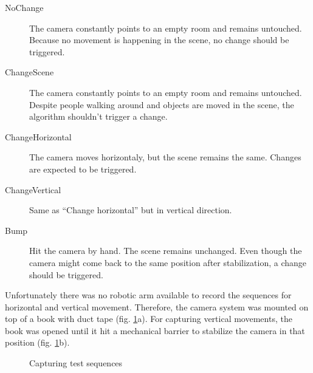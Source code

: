 \begin{description}
	\item[NoChange] The camera constantly points to an empty room and remains untouched. Because no movement is happening in the scene, no change should be triggered.
	\item[ChangeScene] The camera constantly points to an empty room and remains untouched. Despite people walking around and objects are moved in the scene, the algorithm shouldn't trigger a change.
	\item[ChangeHorizontal] The camera moves horizontaly, but the scene remains the same. Changes are expected to be triggered.
	\item[ChangeVertical] Same as \enquote{Change horizontal} but in vertical direction.
	\item[Bump] Hit the camera by hand. The scene remains unchanged. Even though the camera might come back to the same position after stabilization, a change should be triggered.
\end{description}

Unfortunately there was no robotic arm available to record the sequences for horizontal and vertical movement. Therefore, the camera system was mounted on top of a book with duct tape (fig. \ref{fig:capture}a). For capturing vertical movements, the book was opened until it hit a mechanical barrier to stabilize the camera in that position (fig. \ref{fig:capture}b).\newline

\begin{figure} [h]
	\caption{Capturing test sequences} 
	\label{fig:capture}
\end{figure} 
 
